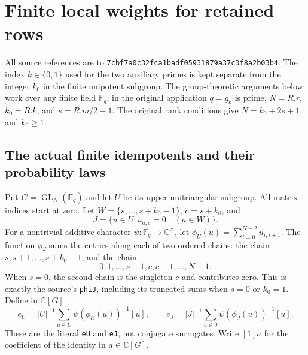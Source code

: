 \section{Finite local weights for retained rows}
\label{sec:retained-rows-v42}


All source references are to
\texttt{7cbf7a0c32fca1badf05931879a37c3f8a2b03b4}.
The index $k\in\{0,1\}$ used for the two auxiliary primes is kept
separate from the integer $k_0$ in the finite unipotent subgroup.
The group-theoretic arguments below work over any finite field
$\mathbb F_q$; in the original application $q=g_k$ is prime,
$N=R.r$, $k_0=R.k$, and $s=R.m/2-1$.  The original rank conditions
give $N=k_0+2s+1$ and $k_0\ge1$.

\subsection{The actual finite idempotents and their probability laws}

Put $G=\operatorname{GL}_N(\mathbb F_q)$ and let $U$ be its upper
unitriangular subgroup.  All matrix indices start at zero.  Let
$W=\{s,\ldots,s+k_0-1\}$, $c=s+k_0$, and
\[
 J=\{u\in U:u_{a,c}=0\quad(a\in W)\}.
 \tag{RRT.1}
\]
For a nontrivial additive character $\psi:\mathbb F_q\to\mathbb C^\times$,
let $\phi_U(u)=\sum_{i=0}^{N-2}u_{i,i+1}$.
The function $\phi_J$ sums the entries along each of two ordered
chains: the chain $s,s+1,\ldots,s+k_0-1$, and the chain
\[
                  0,1,\ldots,s-1,c,c+1,\ldots,N-1.
\]
When $s=0$, the second chain is the singleton $c$ and contributes
zero.  This is exactly the source's \texttt{phiJ}, including its
truncated sums when $s=0$ or $k_0=1$.  Define in $\mathbb C[G]$
\[
 e_U=|U|^{-1}\sum_{u\in U}\psi(\phi_U(u))^{-1}[u],\qquad
 e_J=|J|^{-1}\sum_{u\in J}\psi(\phi_J(u))^{-1}[u].
 \tag{RRT.2}
\]
These are the literal \texttt{eU} and \texttt{eJ}, not conjugate
surrogates.  Write $[1]a$ for the coefficient of the identity in
$a\in\mathbb C[G]$.

